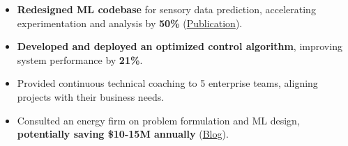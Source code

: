 {
}
\begin{itemize}
    \item \textbf{Redesigned ML codebase} for sensory data prediction, accelerating experimentation and analysis by \textbf{50\%} (\href{https://link.springer.com/article/10.1007/s10994-023-06413-x}{Publication}).
    \item \textbf{Developed and deployed an optimized control algorithm}, improving system performance by \textbf{21\%}.
\end{itemize}

{
}

    
\begin{itemize}
    \item Provided continuous technical coaching to 5 enterprise teams, aligning projects with their business needs.
    \item Consulted an energy firm on problem formulation and ML design, \textbf{potentially saving \$10-15M annually} (\href{https://www.amii.ca/latest-from-amii/venturi-uses-machine-learning-reduce-emissions-increase-safety-pipelines/}{Blog}).
\end{itemize}

